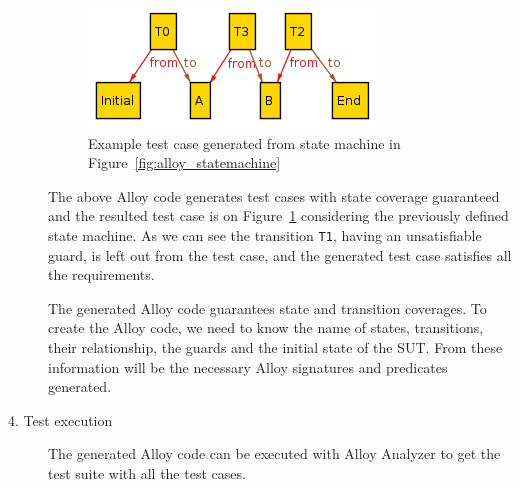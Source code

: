 \begin{description}
\begin{lstlisting}[label={lst:alloy_dynamic}, caption=Dynamically generated Alloy codes,breaklines=true]

\end{lstlisting}

\begin{figure}[htp]
\centering
\includegraphics[scale=0.5]{figures/alloy_statecoverage}
\caption{Example test case generated from state machine in Figure~\ref{fig:alloy_statemachine}}
\label{fig:alloy_statecoverage}
\end{figure}

The above Alloy code generates test cases with state coverage guaranteed and the resulted test case is on Figure~\ref{fig:alloy_statecoverage} considering the previously defined state machine. As we can see the transition \texttt{T1}, having an unsatisfiable guard, is left out from the test case, and the generated test case satisfies all the requirements.

	The generated Alloy code guarantees state and transition coverages. To create the Alloy code, we need to know the name of states, transitions, their relationship, the guards and the initial state of the SUT. From these information will be the necessary Alloy signatures and predicates generated.
	\item[4. Test execution] The generated Alloy code can be executed with Alloy Analyzer to get the test suite with all the test cases.
\end{description}
